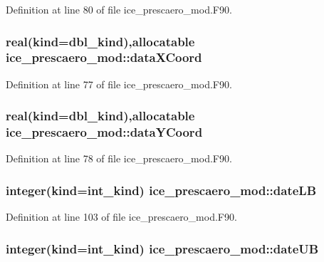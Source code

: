 Definition at line 80 of file ice\_\-prescaero\_\-mod.F90.\hypertarget{namespaceice__prescaero__mod_aec4bdb0ed27915f50239245791a64619}{
\subsubsection[{dataXCoord}]{\setlength{\rightskip}{0pt plus 5cm}real(kind=dbl\_\-kind),allocatable {\bf ice\_\-prescaero\_\-mod::dataXCoord}}}
\label{namespaceice__prescaero__mod_aec4bdb0ed27915f50239245791a64619}


Definition at line 77 of file ice\_\-prescaero\_\-mod.F90.\hypertarget{namespaceice__prescaero__mod_a7ebbdee8a01449422409a6d584c84806}{
\subsubsection[{dataYCoord}]{\setlength{\rightskip}{0pt plus 5cm}real(kind=dbl\_\-kind),allocatable {\bf ice\_\-prescaero\_\-mod::dataYCoord}}}
\label{namespaceice__prescaero__mod_a7ebbdee8a01449422409a6d584c84806}


Definition at line 78 of file ice\_\-prescaero\_\-mod.F90.\hypertarget{namespaceice__prescaero__mod_a6be4e65c946ef5d7a771830e380b7a98}{
\subsubsection[{dateLB}]{\setlength{\rightskip}{0pt plus 5cm}integer(kind=int\_\-kind) {\bf ice\_\-prescaero\_\-mod::dateLB}}}
\label{namespaceice__prescaero__mod_a6be4e65c946ef5d7a771830e380b7a98}


Definition at line 103 of file ice\_\-prescaero\_\-mod.F90.\hypertarget{namespaceice__prescaero__mod_a30a561e9f5e6d98c4f0ea75abe09c691}{
\subsubsection[{dateUB}]{\setlength{\rightskip}{0pt plus 5cm}integer(kind=int\_\-kind) {\bf ice\_\-prescaero\_\-mod::dateUB}}}
\label{namespaceice__prescaero__mod_a30a561e9f5e6d98c4f0ea75abe09c691}


